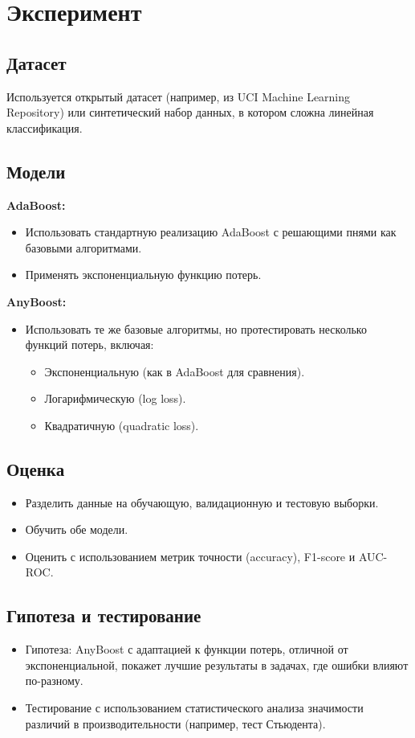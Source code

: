 \section*{Эксперимент}

\subsection*{Датасет}
Используется открытый датасет (например, из UCI Machine Learning Repository) или синтетический набор данных, в котором сложна линейная классификация.

\subsection*{Модели}

\textbf{AdaBoost:}
\begin{itemize}
    \item Использовать стандартную реализацию AdaBoost с решающими пнями как базовыми алгоритмами.
    \item Применять экспоненциальную функцию потерь.
\end{itemize}

\textbf{AnyBoost:}
\begin{itemize}
    \item Использовать те же базовые алгоритмы, но протестировать несколько функций потерь, включая:
    \begin{itemize}
        \item Экспоненциальную (как в AdaBoost для сравнения).
        \item Логарифмическую (log loss).
        \item Квадратичную (quadratic loss).
    \end{itemize}
\end{itemize}

\subsection*{Оценка}
\begin{itemize}
    \item Разделить данные на обучающую, валидационную и тестовую выборки.
    \item Обучить обе модели.
    \item Оценить с использованием метрик точности (accuracy), F1-score и AUC-ROC.
\end{itemize}

\subsection*{Гипотеза и тестирование}
\begin{itemize}
    \item Гипотеза: AnyBoost с адаптацией к функции потерь, отличной от экспоненциальной, покажет лучшие результаты в задачах, где ошибки влияют по-разному.
    \item Тестирование с использованием статистического анализа значимости различий в производительности (например, тест Стьюдента).
\end{itemize}

